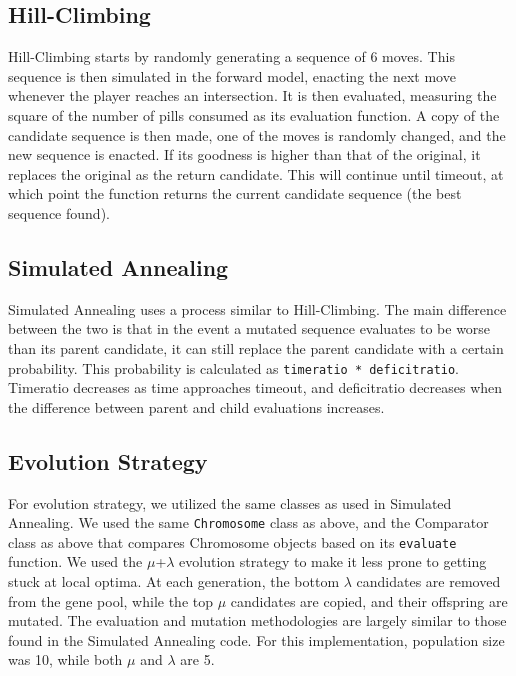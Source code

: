 \documentclass[a4paper]{article}
\begin{document}
\subsection{Hill-Climbing}
Hill-Climbing starts by randomly generating a sequence of 6 moves.  This sequence is then simulated in the forward model, enacting the next move whenever the player reaches an intersection.  It is then evaluated, measuring the square of the number of pills consumed as its evaluation function.  A copy of the candidate sequence is then made, one of the moves is randomly changed, and the new sequence is enacted.  If its goodness is higher than that of the original, it replaces the original as the return candidate.  This will continue until timeout, at which point the function returns the current candidate sequence (the best sequence found).

\subsection{Simulated Annealing}
Simulated Annealing uses a process similar to Hill-Climbing.  The main difference between the two is that in the event a mutated sequence evaluates to be worse than its parent candidate, it can still replace the parent candidate with a certain probability.  This probability is calculated as \texttt{timeratio * deficitratio}.  Timeratio decreases as time approaches timeout, and deficitratio decreases when the difference between parent and child evaluations increases.                                    

\subsection{Evolution Strategy}
For evolution strategy, we utilized the same classes as used in Simulated Annealing. We used the same \texttt{Chromosome} class as above, and the Comparator class as above that compares Chromosome objects based on its \texttt{evaluate} function. We used the $\mu$+$\lambda$ evolution strategy to make it less prone to getting stuck at local optima. At each generation, the bottom $\lambda$ candidates are removed from the gene pool, while the top $\mu$ candidates are copied, and their offspring are mutated.  The evaluation and mutation methodologies are largely similar to those found in the Simulated Annealing code.  For this implementation, population size was 10, while both  $\mu$ and $\lambda$ are 5.
\end{document}
